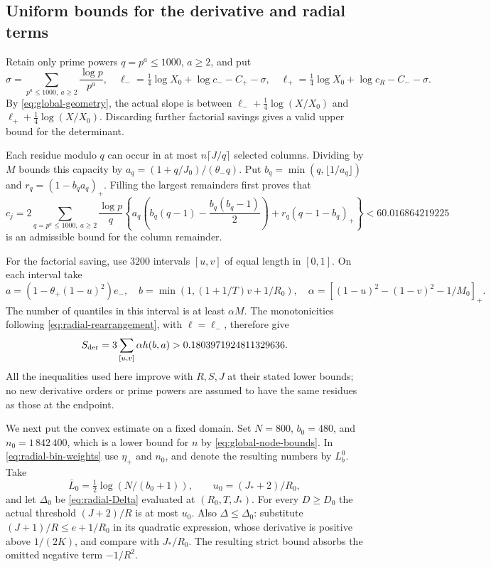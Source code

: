 \subsection{Uniform bounds for the derivative and radial terms}
Retain only prime powers $q=p^a\leq1000$, $a\geq2$, and put
\[
 \sigma=\sum_{p^a\leq1000,\ a\geq2}\frac{\log p}{p^a},
 \quad\ell_- =\tfrac14\log X_0+\log c_- -C_+-\sigma,
 \quad\ell_+ =\tfrac14\log X_0+\log c_R-C_- -\sigma.
\]
By \eqref{eq:global-geometry}, the actual slope is between
$\ell_-+\frac14\log(X/X_0)$ and
$\ell_++\frac14\log(X/X_0)$. Discarding further factorial savings
gives a valid upper bound for the determinant.

Each residue modulo $q$ can occur in at most $n\lceil J/q\rceil$
selected columns. Dividing by $M$ bounds this capacity by
$a_q=(1+q/J_0)/(\theta_-q)$.
Put $b_q=\min(q,\lfloor1/a_q\rfloor)$ and
$r_q=(1-b_qa_q)_+$. Filling the largest remainders first proves that
\begin{equation}\label{eq:global-column-remainder}
 c_j=2\sum_{q=p^a\leq1000,\ a\geq2}\frac{\log p}{q}
 \left\{a_q\left(b_q(q-1)-\frac{b_q(b_q-1)}2\right)
                       +r_q(q-1-b_q)_+\right\}
       <60.016864219225
\end{equation}
is an admissible bound for the column remainder.

For the factorial saving, use $3200$ intervals $[u,v]$ of equal length
in $[0,1]$. On each interval take
\[
 a=(1-\theta_+(1-u)^2)e_-,\quad
 b=\min(1,(1+1/T)v+1/R_0),\quad
 \alpha=[(1-u)^2-(1-v)^2-1/M_0]_+.
\]
The number of quantiles in this interval is at least $\alpha M$.
The monotonicities following \eqref{eq:radial-rearrangement}, with
$\ell=\ell_-$, therefore give
\begin{equation}\label{eq:global-factorial-saving}
 S_{\rm der}=3\sum_{[u,v]}\alpha h(b,a)
                       >0.1803971924811329636.
\end{equation}
All the inequalities used here improve with $R,S,J$ at their stated
lower bounds; no new derivative orders or prime powers are assumed
to have the same residues as those at the endpoint.

We next put the convex estimate on a fixed domain. Set $N=800$,
$b_0=480$, and $n_0=1\,842\,400$, which is a lower bound for $n$ by
\eqref{eq:global-node-bounds}. In \eqref{eq:radial-bin-weights} use
$\eta_+$ and $n_0$, and denote the resulting numbers by $L_b^0$.
Take
\[
 \overline L_0=\tfrac12\log(N/(b_0+1)),\qquad
 u_0=(J_*+2)/R_0,
\]
and let $\Delta_0$ be \eqref{eq:radial-Delta} evaluated at $(R_0,T,J_*)$.
For every $D\geq D_0$ the actual threshold $(J+2)/R$ is at most
$u_0$. Also $\Delta\leq\Delta_0$: substitute
$(J+1)/R\leq e+1/R_0$ in its quadratic expression, whose derivative
is positive above $1/(2K)$, and compare with $J_*/R_0$.
The resulting strict bound absorbs the omitted negative term $-1/R^2$.

